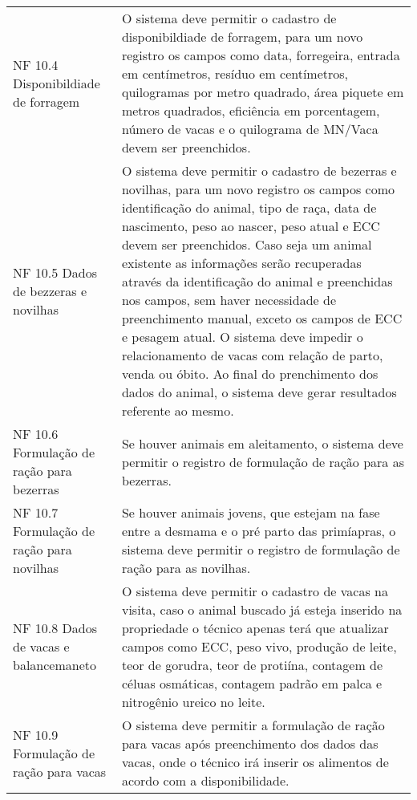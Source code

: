 \begin{tabframed}[htb]
\begin{tabular}{|l|l|}
    NF 10.4 Disponibildiade de forragem       &
    \multicolumn{1}{|p{8cm}|}{\raggedright O sistema deve permitir o cadastro de disponibildiade de forragem, para um novo registro os campos como data, forregeira, entrada em centímetros, resíduo em centímetros, quilogramas por metro quadrado, área piquete em metros quadrados, eficiência em porcentagem, número de vacas e o quilograma de MN/Vaca devem ser preenchidos.}
    \\ \cline{1-2}

    NF 10.5  Dados de bezzeras e novilhas     &
    \multicolumn{1}{|p{8cm}|}{\raggedright O sistema deve permitir o cadastro de bezerras e novilhas, para um novo registro os campos como identificação do animal, tipo de raça, data de nascimento, peso ao nascer, peso atual e \gls{ECC} devem ser preenchidos. Caso seja um animal existente as informações serão recuperadas através da identificação do animal e preenchidas nos campos, sem haver necessidade de preenchimento manual, exceto os campos de \gls{ECC} e pesagem atual. O sistema deve impedir o relacionamento de vacas com relação de parto, venda ou óbito. Ao final do prenchimento dos dados do animal, o sistema deve gerar resultados referente ao mesmo.}
    \\ \cline{1-2}

    NF 10.6 Formulação de ração para bezerras &
    \multicolumn{1}{|p{8cm}|}{\raggedright Se houver animais em aleitamento, o sistema deve permitir o registro de formulação de ração para as bezerras.}
    \\ \cline{1-2}

    NF 10.7 Formulação de ração para novilhas &
    \multicolumn{1}{|p{8cm}|}{\raggedright Se houver animais jovens, que estejam na fase entre a desmama e o pré parto das primíapras, o sistema deve permitir o registro de formulação de ração para as novilhas.}
    \\ \cline{1-2}

    NF 10.8 Dados de vacas e balancemaneto    &
    \multicolumn{1}{|p{8cm}|}{\raggedright O sistema deve permitir o cadastro de vacas na visita, caso o animal buscado já esteja inserido na propriedade o técnico apenas terá que atualizar campos como \gls{ECC}, peso vivo, produção de leite, teor de gorudra, teor de protiína, contagem de céluas osmáticas, contagem padrão em palca e nitrogênio ureico no leite.}
    \\ \cline{1-2}

    NF 10.9 Formulação de ração para vacas    &
    \multicolumn{1}{|p{8cm}|}{\raggedright O sistema deve permitir a formulação de ração para vacas após preenchimento dos dados das vacas, onde o técnico irá inserir os alimentos de acordo com a disponibilidade.}
    \\ \cline{1-2}
  \end{tabular}
  \fonte{} %
\end{tabframed}

